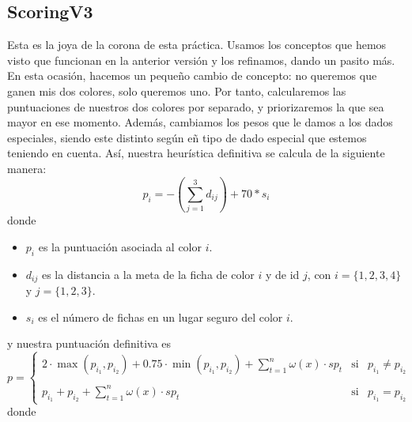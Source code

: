\documentclass[10pt,a4paper]{article}
\begin{document}
\subsection{ScoringV3}
Esta es la joya de la corona de esta práctica. Usamos los conceptos que hemos visto que funcionan en la anterior versión y los refinamos, dando un pasito más. En esta ocasión, hacemos un pequeño cambio de concepto: no queremos que ganen mis dos colores, solo queremos uno. Por tanto, calcularemos las puntuaciones de nuestros dos colores por separado, y priorizaremos la que sea mayor en ese momento. Además, cambiamos los pesos que le damos a los dados especiales, siendo este distinto según eñ tipo de dado especial que estemos teniendo en cuenta. Así, nuestra heurística definitiva se calcula de la siguiente manera:
\[
	p_i  = - \left( \sum_{j = 1}^{3} d_{ij} \right) + 70*s_i
\]
donde 
\begin{itemize}
	\item \(p_i\) es la puntuación asociada al color \(i\).
	\item \(d_{ij}\) es la distancia a la meta de la ficha de color \(i\) y de id \(j\), con \(i = \{1,2,3,4\}\) y \(j = \{1,2,3\}\).
	\item \(s_i\) es el número de fichas en un lugar seguro del color \(i\).
\end{itemize}
y nuestra puntuación definitiva es 
\[
	p = 
	\left\{
	\begin{array}{lll}
		2 \cdot \max (p_{i_1}, p_{i_2}) + 0.75 \cdot \min (p_{i_1}, p_{i_2}) + \sum_{t=1}^{n} \omega (x) \cdot sp_t & \text{si} & p_{i_1} \neq p_{i_2} \\
		& &  \\
		p_{i_1} + p_{i_2} + \sum_{t=1}^{n} \omega (x) \cdot sp_t & \text{si} & p_{i_1} = p_{i_2}
	\end{array}
	\right.
\]
donde
\end{document}
